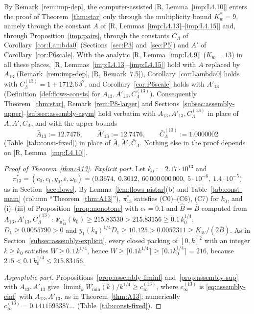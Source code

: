 \documentclass[11pt]{amsart}
\newcommand{\eps}{\varepsilon}
\newcommand{\Lam}{\Lambda}
\theoremstyle{definition}
\theoremstyle{remark}
\numberwithin{equation}{section}
\begin{document}
By Remark~\ref{rem:imp-dep}, the computer-assisted [R, Lemma~\ref{imp:L4.10}] enters the proof of
Theorem~\ref{thm:star} only through the multiplicity bound $K_w^*=9$, namely through the constant $A$ of
[R, Lemmas~\ref{imp:L4.13}--\ref{imp:L4.15}] and, through Proposition~\ref{imp:pairs}, through the constants $C_\Lam$
of Corollary~\ref{cor:Lambda0} (Sections~\ref{sec:P3} and~\ref{sec:P5}) and $A'$ of Corollary~\ref{cor:P6scale}. With
the analytic [R, Lemma~\ref{imp:L4.9}] ($K_w=13$) in all these places, [R, Lemmas~\ref{imp:L4.13}--\ref{imp:L4.15}]
hold with $A$ replaced by $A_{13}$ (Remark~\ref{rem:imp-dep}, [R, Remark~7.5]), Corollary~\ref{cor:Lambda0} holds with
$C_\Lam^{(13)}=1+1712.6\,\delta^2$, and Corollary~\ref{cor:P6scale} holds with $A'_{13}$
(Definition~\ref{def:flows-consts} for $A_{13},A'_{13},C^{(13)}_\Lam$). Consequently Theorem~\ref{thm:star},
Remark~\ref{rem:P8-larger} and Sections~\ref{subsec:assembly-upper}--\ref{subsec:assembly-asym} hold verbatim with
$A_{13},A'_{13},C_\Lam^{(13)}$ in place of $A,A',C_\Lam$, and with the upper bounds
\[
\bar A_{13}:=12.7476,\qquad \bar A'_{13}:=12.7476,\qquad \bar C^{(13)}_\Lam:=1.0000002
\]
(Table~\ref{tab:const-fixed}) in place of $\bar A,\bar A',\bar C_\Lam$. Nothing else in the proof depends on
[R, Lemma~\ref{imp:L4.10}].

\begin{proof}[Proof of Theorem~\ref{thm:A13}]
\emph{Explicit part.} Let $k_0:=2.17\cdot10^{13}$ and
\[
\pi^*_{13}=(c_0,c_1,y_0,\eps,\omega_0)=\big(0.3674,\ 0.3012,\ 60\,000\,000\,000,\ 5\cdot10^{-6},\ 1.4\cdot10^{-5}\big)
\]
as in Section~\ref{sec:flows}. By Lemma~\ref{lem:flows-pistar}(b) and Table~\ref{tab:const-main} (column
``Theorem~\ref{thm:A13}''), $\pi^*_{13}$ satisfies (C0)--(C6), (C7) for $k_0$, and (i)--(iii) of
Proposition~\ref{prop:monotone} with $c_*=0.1$ and $\hat B=\bar B$ computed from
$\bar A_{13},\bar A'_{13},\bar C^{(13)}_\Lam$: $\bar\Psi_{\pi^*_{13}}(k_0)\ge215.83530>215.83156\ge0.1\,k_0^{1/4}$,
$D_1\ge0.0055790>0$ and $y_1(k_0)^{1/4}D_1\ge10.125>0.0052311\ge K_W/(2\bar B)$. As in
Section~\ref{subsec:assembly-explicit}, every closed packing of $[0,k]^2$ with an integer $k\ge k_0$ satisfies
$W\ge0.1\,k^{1/4}$, hence $W\ge\lceil0.1k^{1/4}\rceil\ge\lceil0.1k_0^{1/4}\rceil=216$, because
$215<0.1\,k_0^{1/4}\le215.83156$.

\emph{Asymptotic part.} Propositions~\ref{prop:assembly-liminf} and~\ref{prop:assembly-sup} with $A_{13},A'_{13}$ give
$\liminf_kW_{\min}(k)/k^{1/4}\ge c_\infty^{(13)}$, where $c^{(13)}_\infty$ is \eqref{eq:assembly-cinf} with
$A_{13},A'_{13}$, as in Theorem~\ref{thm:A13}; numerically $c^{(13)}_\infty=0.1411593387\ldots$
(Table~\ref{tab:const-fixed}).
\end{proof}
\end{document}
